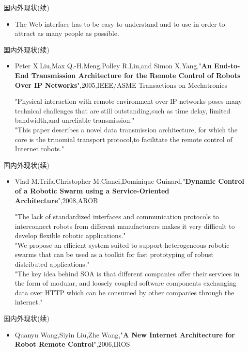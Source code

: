 \documentclass[CJK]{beamer}
\begin{document}
\begin{CJK*}{UTF8}{gkai}
\begin{frame}{国内外现状(续)}
\begin{itemize}
	\item The Web interface has to be easy to understand and to use in order to attract as many people as possible.
\end{itemize}
\end{frame}
\begin{frame}{国内外现状(续)}
\begin{itemize}
	\item Peter X.Liu,Max Q.-H.Meng,Polley R.Liu,and Simon X.Yang,"{\bf An End-to-End Transmission Architecture for the Remote Control of Robots Over IP Networks}",2005,IEEE/ASME Transactions on Mechatronics
	\begin{block}{}
	"Physical interaction with remote environment over IP networks poses many technical challenges that are still outstanding,such as time delay, limited bandwidth,and unreliable transmission."\\
	"This paper describes a novel data transmission architecture, for which the core is the trinomial transport protocol,to facilitate the remote control of Internet robots."
	\end{block}
\end{itemize}
\end{frame}
\begin{frame}{国内外现状(续)}
\begin{itemize}
	\item Vlad M.Trifa,Christopher M.Cianci,Dominique Guinard,"{\bf Dynamic Control of a Robotic Swarm using a Service-Oriented Architecture}",2008,AROB
	\begin{block}{}
	"The lack of standardized interfaces and communication protocols to interconnect robots from different manufacturers makes it very difficult to develop flexible robotic applications."\\
	"We propose an efficient system suited to support heterogeneous robotic swarms that can be used as a toolkit for fast prototyping of robust distributed applications."\\
	"The key idea behind SOA is that different companies offer their services in the form of modular, and loosely coupled software components exchanging data over HTTP which can be consumed by other companies through the internet."
	\end{block}
\end{itemize}
\end{frame}
\begin{frame}{国内外现状(续)}
\begin{itemize}
\item Quanyu Wang,Siyin Liu,Zhe Wang,"{\bf A New Internet Architecture for Robot Remote Control}",2006,IROS

\end{itemize}
\end{frame}
\end{CJK*}
\end{document}
